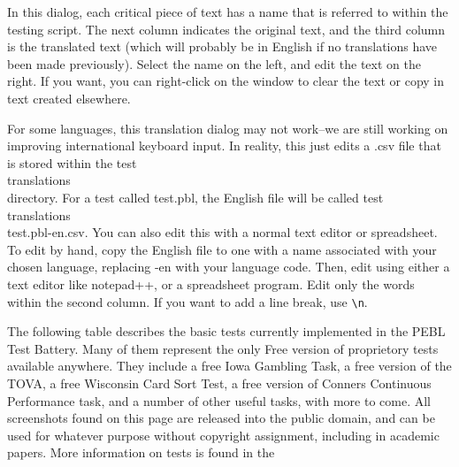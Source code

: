 In this dialog,  each critical piece of text has a name that is referred to within the testing script.  The next column indicates the original text, and the third column is the translated text (which will probably be in English if no translations have been made previously).  Select the name on the left, and edit the text on the right.  If you want, you can right-click on the window to clear the text or copy in text created elsewhere.  

For some languages, this translation dialog may not work--we are still working on improving international keyboard input.  In reality, this just edits a .csv file that is stored within the test\\translations\\ directory.  For a test called test.pbl, the English file will be called test\\translations\\test.pbl-en.csv.  You can also edit this with a normal text editor or spreadsheet.  To edit by hand, copy the English file to one with a name associated with your chosen language, replacing -en with your language code.  Then, edit using either a text editor like notepad++, or a spreadsheet program.  Edit only the words within the second column.  If you want to add a line break, use \verb|\n|.


{

The following table describes the basic tests currently implemented in
the PEBL Test Battery. Many of them represent the only Free version of
proprietory tests available anywhere. They include a free Iowa Gambling
Task, a free version of the TOVA{\textregistered}, a free Wisconsin
Card Sort Test{\textregistered}, a free version of Conners Continuous
Performance task, and a number of other useful tasks, with more to
come. All screenshots found on this page are released into the public
domain, and can be used for whatever purpose without copyright
assignment, including in academic papers. More information on tests is
found in the


\href{http://pebl.sourceforge.net/wiki/index.php?title=PEBL_Test_Battery}{}} 


\newpage

